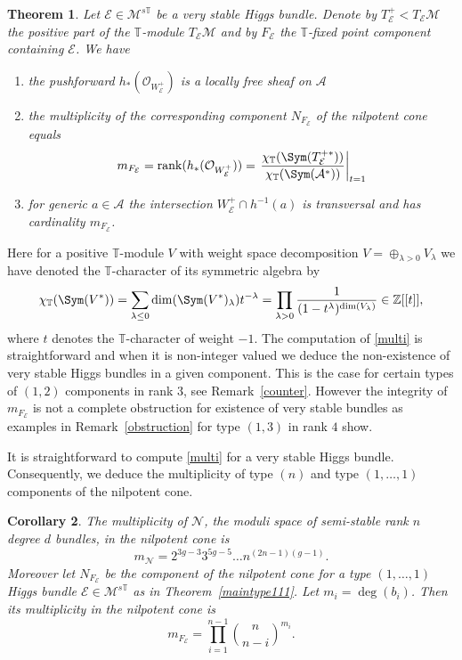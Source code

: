 \documentclass[12pt]{article}
\numberwithin{equation}{section}
\newtheorem{theorem}{Theorem}
\newtheorem{corollary}[theorem]{Corollary}
\theoremstyle{remark}
\theoremstyle{definition}
\numberwithin{theorem}{section}
\def\beq{\begin{eqnarray}}
\def\eeq{\end{eqnarray}}
\def\bes{\begin{eqnarray*}}
\def\ees{\end{eqnarray*}}
\def\calE{{\mathcal E}}
\DeclareMathOperator{\rank}{rank}
\def\calN{{\mathcal{N}}}
\def\M{{\mathcal{M}}}
\def\calA{{\mathcal{A}}}
\newcommand{\T}{{\mathbb{T}}}
\def\calO{{\mathcal O}}
\def\Z{\mathbb{Z}}
\renewcommand{\1}{\mathbbm{1}}
\begin{document}
\begin{theorem} \label{mainmulti} Let $\calE\in \M^{s\T}$ be a very stable Higgs bundle. Denote by $T^+_\calE<T_\calE\M$ the positive part of the $\T$-module $T_\calE\M$ and by $F_\calE$ the $\T$-fixed point component containing $\calE$. We have  \begin{enumerate} \item the pushforward $h_*(\calO_{W^+_\calE})$ is a locally free sheaf on $\calA$ \item the multiplicity of the corresponding component $N_{F_\calE}$ of the nilpotent cone equals \beq \label{multi} m_{F_\calE}=\rank(h_*(\calO_{W^+_\calE}))=\left. { \chi_\T(\Sym(T^{+*}_\calE))\over \chi_\T(\Sym(\calA^*))}\right|_{t=1}\eeq  \item for generic $a\in \calA$  the intersection $W^+_\calE\cap h^{-1}(a)$ is transversal and has cardinality $m_{F_\calE}$. \end{enumerate}
\end{theorem}
Here for a positive $\T$-module $V$ with weight space decomposition $V=\oplus_{\lambda>0} V_\lambda$ we have denoted the  $\T$-character of its symmetric algebra by 
\bes\chi_\T({\Sym(V^*)})= \sum_{\lambda\leq 0} \dim(\Sym(V^*)_\lambda)t^{-\lambda}= \prod_{\lambda>0}\frac{1}{( 1- t^{\lambda})^{\dim(V_\lambda)}} \in \Z[[t]],\ees where $t$ denotes the $\T$-character of weight $-1$. 
The computation of \eqref{multi} is straightforward and when it is non-integer valued we  deduce the non-existence of very stable Higgs bundles in a given component. This is the case for certain types  of $(1,2)$ components in  rank $3$, see Remark~\ref{counter}. However the integrity of $m_{F_\calE}$ is not a complete obstruction for existence of very stable bundles as examples in Remark~\ref{obstruction} for type $(1,3)$ in rank $4$ show.

It is straightforward to compute \eqref{multi} for a very stable Higgs bundle. Consequently, we  deduce the multiplicity of type $(n)$ and type $(1,\dots,1)$ components of the nilpotent cone. 

\begin{corollary} \label{maincor} The multiplicity of $\calN$, the moduli space of semi-stable rank $n$ degree $d$ bundles, in the nilpotent cone is  $$m_\calN=2^{3g-3}3^{5g-5}\dots n^{(2n-1)(g-1)}.$$ Moreover let $N_{F_\calE}$ be the component of the nilpotent cone for a type $(1,\dots,1)$ Higgs bundle $\calE\in \M^{s\T}$ as in Theorem~\ref{maintype111}. Let $m_i=\deg(b_i)$. Then its multiplicity in the nilpotent cone is $$m_{F_{\calE}}=\prod_{i=1}^{n-1}{n\choose n-i}^{m_i}.$$
\end{corollary}
\end{document}
